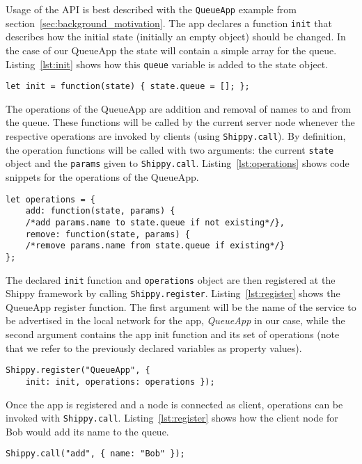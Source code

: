 Usage of the API is best described with the \texttt{QueueApp} example from section~\ref{sec:background_motivation}.
The app declares a function \texttt{init} that describes how the initial state (initially an empty object) should be changed.
In the case of our QueueApp the state will contain a simple array for the queue.
Listing~\ref{lst:init} shows how this \texttt{queue} variable is added to the state object.

\begin{lstlisting}[caption={QueueApp init function},label={lst:init}]
let init = function(state) { state.queue = []; };
\end{lstlisting}

The operations of the QueueApp are addition and removal of names to and from the queue.
These functions will be called by the current server node whenever the respective operations are invoked by clients (using \texttt{Shippy.call}).
By definition, the operation functions will be called with two arguments: the current \texttt{state} object and the \texttt{params} given to \texttt{Shippy.call}.
Listing~\ref{lst:operations} shows code snippets for the operations of the QueueApp.

\begin{lstlisting}[caption={QueueApp operations},label={lst:operations}]
let operations = {
    add: function(state, params) {
    /*add params.name to state.queue if not existing*/},
    remove: function(state, params) {
    /*remove params.name from state.queue if existing*/}
};
\end{lstlisting}

The declared \texttt{init} function and \texttt{operations} object are then registered at the Shippy framework by calling \texttt{Shippy.register}.
Listing~\ref{lst:register} shows the QueueApp register function.
The first argument will be the name of the service to be advertised in the local network for the app, \textit{QueueApp} in our case,
 while the second argument contains the app init function and its set of operations (note that we refer to the previously declared variables as property values).


\begin{lstlisting}[caption={Shippy.register},label={lst:register}]
Shippy.register("QueueApp", {
    init: init, operations: operations });
\end{lstlisting}

Once the app is registered and a node is connected as client, operations can be invoked with \texttt{Shippy.call}. Listing~\ref{lst:register} shows how the client node for Bob would add its name to the queue.
\begin{lstlisting}[caption={Shippy.call},label={lst:call}]
Shippy.call("add", { name: "Bob" });
\end{lstlisting}

